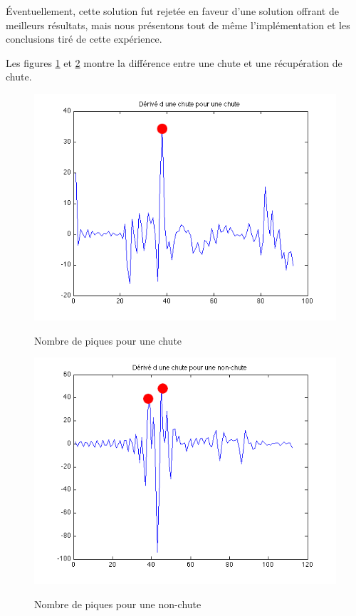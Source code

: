 \documentclass[12pt,letterpaper]{article}
\begin{document}
Éventuellement, cette solution fut rejetée en faveur d'une solution offrant de meilleurs résultats, mais nous 
présentons tout de même l'implémentation et les conclusions tiré de cette expérience.

Les figures \ref{fig:chute} et \ref{fig:nonchute} montre la différence entre une chute et une récupération de chute.

\begin{figure}[htp]
\centering
\includegraphics{image/piques_chute.png}
\label{fig:chute}
\caption{Nombre de piques pour une chute}
\end{figure}

\begin{figure}[htp]
\centering
\includegraphics{image/piques_nonchute.png}
\label{fig:nonchute}
\caption{Nombre de piques pour une non-chute}
\end{figure}
\end{document}
